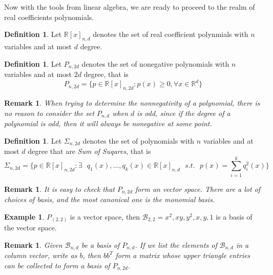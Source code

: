 \documentclass[12pt]{amsart}
\numberwithin{equation}{section}
\newtheorem{remark}[thm]{Remark}
\theoremstyle{definition}
\newtheorem{definition}[thm]{Definition}
\newtheorem{example}[thm]{Example}
\numberwithin{thm}{section}
\begin{document}
\smallskip

Now with the tools from linear algebra, we are ready to proceed to the realm of real coefficients polynomials.

\begin{definition}
     Let $\mathbb{R}[x]_{n,d}$ denotes the set of real coefficient 
     polynmials with $n$ variables and at most $d$ degree.
\end{definition}

\begin{definition}
     Let $P_{n, 2d}$ denotes the set of nonegative polynomials with 
     $n$ variables and at most $2d$ degree, that is 
     \begin{equation}
          P_{n, 2d} = \{ p \in \mathbb{R}[x]_{n, 2d}: p(x) \geq 0, \forall x \in \mathbb{R}^d \}
     \end{equation}
\end{definition}

\begin{remark}
     When trying to determine the nonnegativity of a polynomial, there is no reason to consider the set $P_{n, d}$ when $d$ is odd, since if the 
     degree of a polynomial is odd, then it will always be nonegative at some point.
\end{remark}

\begin{definition}
     Let $\Sigma_{n,2d}$ denotes the set of polynomials with $n$ variables and at most
     $d$ degree that are \emph{Sum of Suqares}, that is
     \begin{equation}
          \Sigma_{n, 2d} = \{ p \in \mathbb{R}[x]_{n, 2d}: \exists \text{ } q_1(x), ..., q_k(x) \in \mathbb{R}[x]_{n,d} \text{ } s.t. \text{ }  p(x) = \sum_{i=1}^k q_i^2(x)\}
     \end{equation}     
\end{definition}

\begin{remark}
     It is easy to check that $P_{n, 2d}$ form an vector space. There are a lot of choices of basis, and the most canonical one is the monomial basis.
\end{remark}

\begin{example}
     $P_(2, 2)$ is a vector space, then $\mathcal{B}_{2, 2} = {x^2, xy, y^2, x, y, 1}$ is a basis of the vector space.
\end{example}

\begin{remark}
     Given $\mathcal{B}_{n, d}$ be a basis of $P_{n, d}$. If we list the elements of $\mathcal{B}_{n, d}$ in a column vector, write as $b$, then $b b^T$ form a matrix whose upper triangle entries can be collected to form a basis of $P_{n, 2d}$.
\end{remark}
\end{document}
